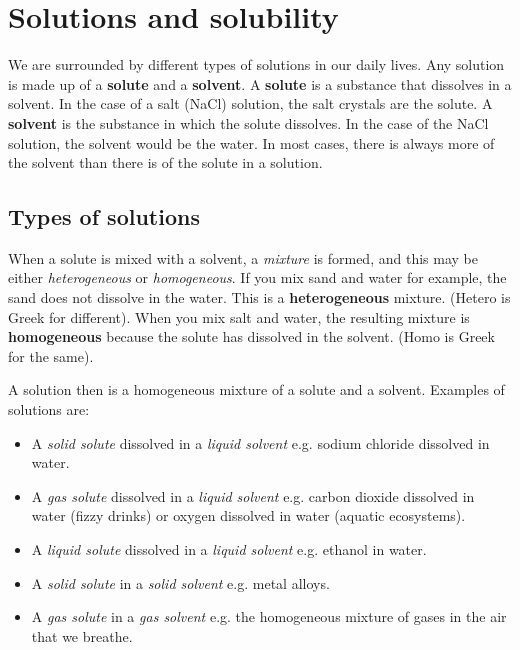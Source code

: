 \chapter{Solutions and solubility}
\label{chap:solutions}

We are surrounded by different types of solutions in our daily lives. Any solution is made up of a \textbf{solute} and a \textbf{solvent}. A \textbf{solute} is a substance that dissolves in a solvent. In the case of a salt (NaCl) solution, the salt crystals are the solute. A \textbf{solvent} is the substance in which the solute dissolves. In the case of the NaCl solution, the solvent would be the water. In most cases, there is always more of the solvent than there is of the solute in a solution.



\section{Types of solutions}
\label{sec:soln:types}

When a solute is mixed with a solvent, a \textit{mixture} is formed, and this may be either \textit{heterogeneous} or \textit{homogeneous}. If you mix sand and water for example, the sand does not dissolve in the water. This is a \textbf{heterogeneous} mixture. (Hetero is Greek for different). When you mix salt and water, the resulting mixture is \textbf{homogeneous} because the solute has dissolved in the solvent. (Homo is Greek for the same). \\


A solution then is a homogeneous mixture of a solute and a solvent. Examples of solutions are:

\begin{itemize}
\item{A \textit{solid solute} dissolved in a \textit{liquid solvent} e.g. sodium chloride dissolved in water.}
\item{A \textit{gas solute} dissolved in a \textit{liquid solvent} e.g. carbon dioxide dissolved in water (fizzy drinks) or oxygen dissolved in water (aquatic ecosystems).}
\item{A \textit{liquid solute} dissolved in a \textit{liquid solvent} e.g. ethanol in water.}
\item{A \textit{solid solute} in a \textit{solid solvent} e.g. metal alloys.}
\item{A \textit{gas solute} in a \textit{gas solvent} e.g. the homogeneous mixture of gases in the air that we breathe.}
\end{itemize}

